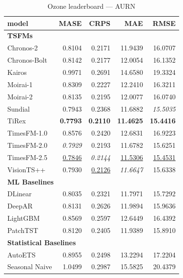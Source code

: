 \begin{table}[H]
\caption{Ozone leaderboard --- AURN}
\centering
\begin{small}
\begin{tabular}{lrrrr}
\toprule
model & MASE & CRPS & MAE & RMSE \\
\midrule
\multicolumn{5}{l}{\textbf{TSFMs}} \\
Chronos-2 & 0.8104 & 0.2171 & 11.9439 & 16.0707 \\
Chronos-Bolt & 0.8142 & 0.2177 & 12.0054 & 16.1352 \\
Kairos & 0.9971 & 0.2691 & 14.6580 & 19.3324 \\
Moirai-1 & 0.8309 & 0.2227 & 12.2410 & 16.3211 \\
Moirai-2 & 0.8135 & 0.2195 & 12.0077 & 16.0740 \\
Sundial & 0.7943 & 0.2368 & 11.6882 & \textit{15.5035} \\
TiRex & \textbf{0.7793} & \textbf{0.2110} & \textbf{11.4625} & \textbf{15.4416} \\
TimesFM-1.0 & 0.8576 & 0.2420 & 12.6831 & 16.9223 \\
TimesFM-2.0 & \textit{0.7929} & 0.2193 & 11.6782 & 15.6251 \\
TimesFM-2.5 & \underline{0.7846} & \textit{0.2144} & \underline{11.5306} & \underline{15.4531} \\
VisionTS++ & 0.7930 & \underline{0.2126} & \textit{11.6647} & 15.6338 \\
\midrule
\multicolumn{5}{l}{\textbf{ML Baselines}} \\
DLinear & 0.8035 & 0.2321 & 11.7971 & 15.7292 \\
DeepAR & 0.8131 & 0.2626 & 11.9894 & 15.9636 \\
LightGBM & 0.8569 & 0.2597 & 12.6449 & 16.4392 \\
PatchTST & 0.8120 & 0.2405 & 11.9389 & 15.8910 \\
\midrule
\multicolumn{5}{l}{\textbf{Statistical Baselines}} \\
AutoETS & 0.8955 & 0.2498 & 13.2294 & 17.2204 \\
Seasonal Naive & 1.0499 & 0.2987 & 15.5825 & 20.4379 \\
\bottomrule
\end{tabular}
\end{small}
\end{table}